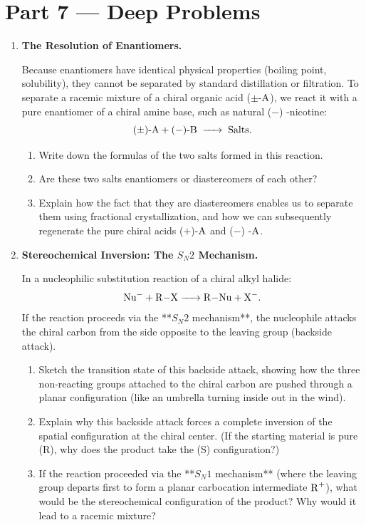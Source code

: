 \documentclass[12pt, a4paper]{book}
\begin{document}
\newpage

\section{Part 7 --- Deep Problems}

\begin{deepbox}
\begin{enumerate}[label=\textbf{D\arabic*.}]
  \item \textbf{The Resolution of Enantiomers.}
  
        Because enantiomers have identical physical properties (boiling point, solubility), they cannot be separated by standard distillation or filtration.
        To separate a racemic mixture of a chiral organic acid ($\pm$-$\ce{A}$), we react it with a pure enantiomer of a chiral amine base, such as natural ($-$) -nicotine:
        \[
          (\pm)\text{-}\ce{A} + (-)\text{-}\ce{B} \;\ce{->}\; \text{Salts}.
        \]
        \begin{enumerate}[label=(\alph*)]
          \item Write down the formulas of the two salts formed in this reaction.
          \item Are these two salts enantiomers or diastereomers of each other?
          \item Explain how the fact that they are diastereomers enables us to separate them using fractional crystallization, and how we can subsequently regenerate the pure chiral acids ($+$)-$\ce{A}$ and ($-$) -$\ce{A}$.
        \end{enumerate}

  \item \textbf{Stereochemical Inversion: The $S_N2$ Mechanism.}
  
        In a nucleophilic substitution reaction of a chiral alkyl halide:
        \[
          \ce{Nu- + R-X -> R-Nu + X-}.
        \]
        If the reaction proceeds via the **$S_N2$ mechanism**, the nucleophile attacks the chiral carbon from the side opposite to the leaving group (backside attack).
        \begin{enumerate}[label=(\alph*)]
          \item Sketch the transition state of this backside attack, showing how the three non-reacting groups attached to the chiral carbon are pushed through a planar configuration (like an umbrella turning inside out in the wind).
          \item Explain why this backside attack forces a complete inversion of the spatial configuration at the chiral center. (If the starting material is pure (R), why does the product take the (S) configuration?)
          \item If the reaction proceeded via the **$S_N1$ mechanism** (where the leaving group departs first to form a planar carbocation intermediate $\ce{R+}$), what would be the stereochemical configuration of the product? Why would it lead to a racemic mixture?
        \end{enumerate}
\end{enumerate}
\end{deepbox}
\end{document}
